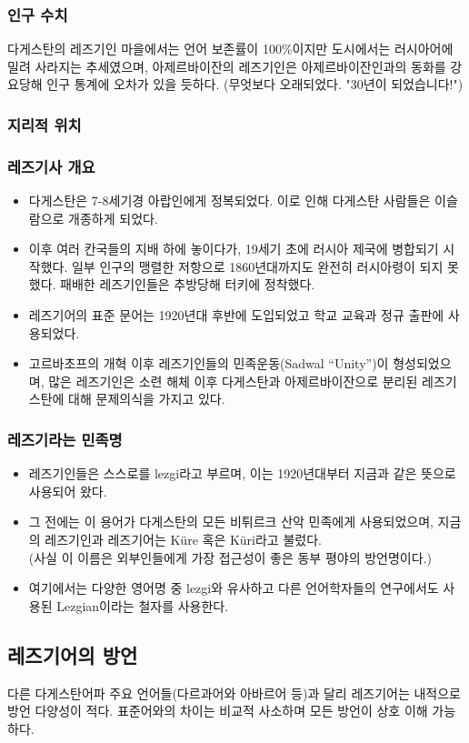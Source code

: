 \subsubsection{인구 수치}
다게스탄의 레즈기인 마을에서는 언어 보존률이 100\%이지만 도시에서는 러시아어에 밀려 사라지는 추세였으며, 아제르바이잔의 레즈기인은 아제르바이잔인과의 동화를 강요당해 인구 통계에 오차가 있을 듯하다. (무엇보다 오래되었다. "30년이 되었습니다!")
\subsubsection{지리적 위치}
\omission
\subsubsection{레즈기사 개요}
\begin{itemize}
	\item 다게스탄은 7-8세기경 아랍인에게 정복되었다. 이로 인해 다게스탄 사람들은 이슬람으로 개종하게 되었다.
	\item 이후 여러 칸국들의 지배 하에 놓이다가, 19세기 초에 러시아 제국에 병합되기 시작했다. 일부 인구의 맹렬한 저항으로 1860년대까지도 완전히 러시아령이 되지 못했다. 패배한 레즈기인들은 추방당해 터키에 정착했다.
	\item 레즈기어의 표준 문어는 1920년대 후반에 도입되었고 학교 교육과 정규 출판에 사용되었다.
	\item 고르바초프의 개혁 이후 레즈기인들의 민족운동(Sadwal “Unity”)이 형성되었으며, 많은 레즈기인은 소련 해체 이후 다게스탄과 아제르바이잔으로 분리된 레즈기스탄에 대해 문제의식을 가지고 있다.
\end{itemize}
\subsubsection{레즈기라는 민족명}
\begin{itemize}
	\item 레즈기인들은 스스로를 lezgi라고 부르며, 이는 1920년대부터 지금과 같은 뜻으로 사용되어 왔다.
	\item 그 전에는 이 용어가 다게스탄의 모든 비튀르크 산악 민족에게 사용되었으며, 지금의 레즈기인과 레즈기어는 Küre 혹은 Küri라고 불렀다.\\(사실 이 이름은 외부인들에게 가장 접근성이 좋은 동부 평야의 방언명이다.)
	\item 여기에서는 다양한 영어명 중 lezgi와 유사하고 다른 언어학자들의 연구에서도 사용된 Lezgian이라는 철자를 사용한다.
\end{itemize}
\subsection{레즈기어의 방언}
다른 다게스탄어파 주요 언어들(다르과어와 아바르어 등)과 달리 레즈기어는 내적으로 방언 다양성이 적다. 표준어와의 차이는 비교적 사소하며 모든 방언이 상호 이해 가능하다.
